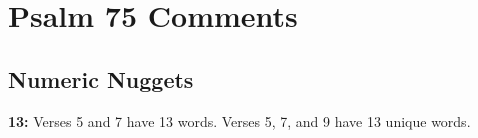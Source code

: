 \section{Psalm 75 Comments}

\subsection{Numeric Nuggets}
\textbf{13: } Verses 5 and 7 have 13 words. Verses 5, 7, and 9 have 13 unique words.

